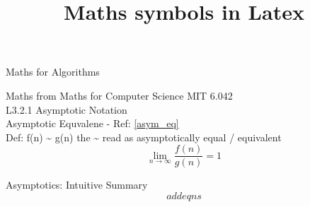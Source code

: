 \documentclass{article}		%
\title{Maths symbols in Latex}
\begin{document}
\begin{Huge}
Maths for Algorithms\\
\end{Huge}


\begin{large}
Maths from Maths for Computer Science MIT 6.042\\

L3.2.1 Asymptotic Notation\\

Asymptotic Equvalene - Ref: \ref{asym_eq}\\

Def: f(n) \~{} g(n)  {} the \~{} read as asymptotically equal / equivalent  \\  
  \begin{equation}
	\lim_{n\to\infty}\frac{f(n)}{g(n)} = 1
  	\label{asym_eq}
  \end{equation} 

Asymptotics: Intuitive Summary\\
  \begin{equation}
  add eqns
  \end{equation} 


\end{large}
\end{document}
